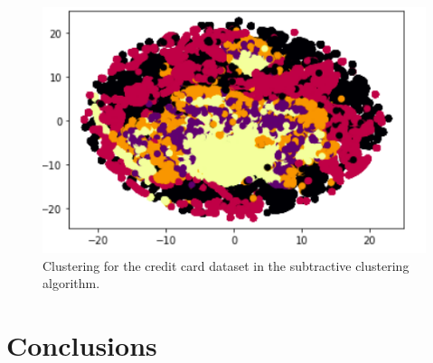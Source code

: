 \documentclass[conference]{IEEEtran}
\begin{document}
\begin{itemize}
    \begin{figure}[ht!]
        \centering
        \includegraphics{figures/credit/credit_s.png}
        \caption{Clustering for the credit card dataset in the subtractive clustering algorithm.}
        \label{fig:credit_s_i}
    \end{figure}
\end{itemize}
\section{Conclusions}

\nocite{*}


\end{document}
